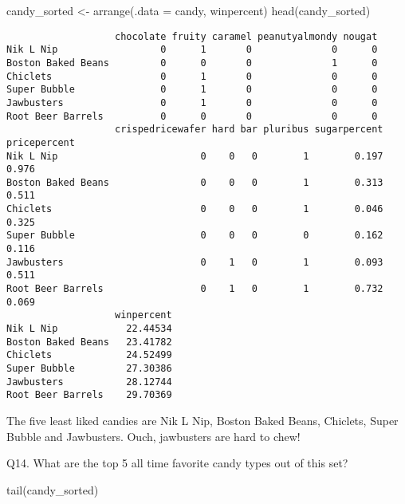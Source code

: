 \documentclass[
  letterpaper,
  DIV=11,
  numbers=noendperiod]{scrartcl}
\newenvironment{Shaded}{\begin{snugshade}}{\end{snugshade}}
\newcommand{\AttributeTok}[1]{\textcolor[rgb]{0.40,0.45,0.13}{#1}}
\newcommand{\FunctionTok}[1]{\textcolor[rgb]{0.28,0.35,0.67}{#1}}
\newcommand{\NormalTok}[1]{\textcolor[rgb]{0.00,0.23,0.31}{#1}}
\newcommand{\OtherTok}[1]{\textcolor[rgb]{0.00,0.23,0.31}{#1}}
\begin{document}
\begin{Shaded}
\begin{Highlighting}[]
\NormalTok{candy\_sorted }\OtherTok{\textless{}{-}} \FunctionTok{arrange}\NormalTok{(}\AttributeTok{.data =}\NormalTok{ candy, winpercent)}
\FunctionTok{head}\NormalTok{(candy\_sorted)}
\end{Highlighting}
\end{Shaded}

\begin{verbatim}
                   chocolate fruity caramel peanutyalmondy nougat
Nik L Nip                  0      1       0              0      0
Boston Baked Beans         0      0       0              1      0
Chiclets                   0      1       0              0      0
Super Bubble               0      1       0              0      0
Jawbusters                 0      1       0              0      0
Root Beer Barrels          0      0       0              0      0
                   crispedricewafer hard bar pluribus sugarpercent pricepercent
Nik L Nip                         0    0   0        1        0.197        0.976
Boston Baked Beans                0    0   0        1        0.313        0.511
Chiclets                          0    0   0        1        0.046        0.325
Super Bubble                      0    0   0        0        0.162        0.116
Jawbusters                        0    1   0        1        0.093        0.511
Root Beer Barrels                 0    1   0        1        0.732        0.069
                   winpercent
Nik L Nip            22.44534
Boston Baked Beans   23.41782
Chiclets             24.52499
Super Bubble         27.30386
Jawbusters           28.12744
Root Beer Barrels    29.70369
\end{verbatim}

The five least liked candies are Nik L Nip, Boston Baked Beans,
Chiclets, Super Bubble and Jawbusters. Ouch, jawbusters are hard to
chew!

Q14. What are the top 5 all time favorite candy types out of this set?

\begin{Shaded}
\begin{Highlighting}[]
\FunctionTok{tail}\NormalTok{(candy\_sorted)}
\end{Highlighting}
\end{Shaded}
\end{document}
